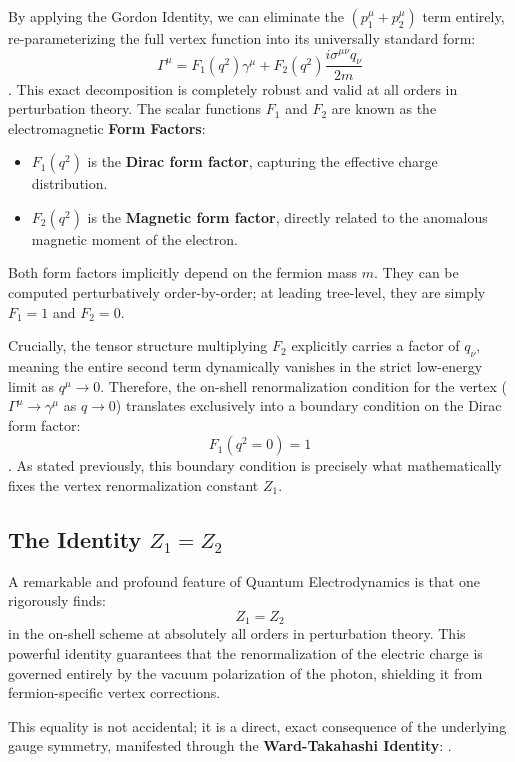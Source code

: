 By applying the Gordon Identity, we can eliminate the $(p_1^\mu + p_2^\mu)$ term entirely, re-parameterizing the full vertex function into its universally standard form:
\[ \Gamma^\mu = F_1(q^2) \gamma^\mu + F_2(q^2) \frac{i\sigma^{\mu\nu} q_\nu}{2m} \].
This exact decomposition is completely robust and valid at all orders in perturbation theory. The scalar functions $F_1$ and $F_2$ are known as the electromagnetic \textbf{Form Factors}:
\begin{itemize}
    \item $F_1(q^2)$ is the \textbf{Dirac form factor}, capturing the effective charge distribution.
    \item $F_2(q^2)$ is the \textbf{Magnetic form factor}, directly related to the anomalous magnetic moment of the electron.
\end{itemize}
Both form factors implicitly depend on the fermion mass $m$. They can be computed perturbatively order-by-order; at leading tree-level, they are simply $F_1 = 1$ and $F_2 = 0$.

Crucially, the tensor structure multiplying $F_2$ explicitly carries a factor of $q_\nu$, meaning the entire second term dynamically vanishes in the strict low-energy limit as $q^\mu \to 0$. Therefore, the on-shell renormalization condition for the vertex ($\Gamma^\mu \to \gamma^\mu$ as $q \to 0$) translates exclusively into a boundary condition on the Dirac form factor:
\[ F_1(q^2 = 0) = 1 \].
As stated previously, this boundary condition is precisely what mathematically fixes the vertex renormalization constant $Z_1$.

\subsection{The Identity \(Z_1 = Z_2\)}

A remarkable and profound feature of Quantum Electrodynamics is that one rigorously finds:
\[ Z_1 = Z_2 \]
in the on-shell scheme at absolutely all orders in perturbation theory. This powerful identity guarantees that the renormalization of the electric charge is governed entirely by the vacuum polarization of the photon, shielding it from fermion-specific vertex corrections.

This equality is not accidental; it is a direct, exact consequence of the underlying gauge symmetry, manifested through the \textbf{Ward-Takahashi Identity}:
.


